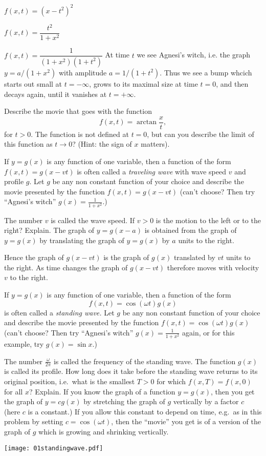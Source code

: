 \begin{multicols}{2}
\subprob $f(x, t) = (x-t^2)^2$

\subprob $f(x, t) = \dfrac{t^2}{1+x^2}$

\subprob $f(x, t) = \dfrac{1}{(1+x^2) (1+t^2)}$
\answer
At time $t$ we see Agnesi's witch, i.e. the graph $y= a/(1+x^2)$
with amplitude $a=1/(1+t^2)$.  Thus we see a bump whcich starts out small
 at $t=-\infty$, grows to its maximal size at time $t=0$, and then decays
again, until it vanishes at $t=+\infty$.
\endanswer

\problem Describe the movie that goes with the function
\[
  f(x, t) = \arctan \frac xt,
\]
for $t>0$.  The function is not defined at $t=0$, but can you describe the limit
of this function as $t\to0$?  (Hint: the sign of $x$ matters).


\problem \label{prb:01traveling-waves}
If $y=g(x)$ is any function of one variable, then a function of the
form $f(x, t) = g(x-vt)$ is often called a \emph{traveling wave} with
wave speed $v$ and profile $g$.  Let $g$ be any non constant
function of your choice and describe the movie presented by the
function $f(x, t) = g(x-vt)$ (can't choose?  Then try ``Agnesi's
witch'' $g(x) = \frac{1}{1+x^2}$.)

The number $v$ is called the wave speed.  If $v>0$ is the motion to
the left or to the right? Explain.
\answer
The graph of $y=g(x-a)$ is obtained from the graph of $y=g(x)$ by
translating the graph of $y=g(x)$ by $a$ units to the right.

Hence the graph of $g(x-vt)$ is the graph of $g(x)$ translated by $vt$
units to the right.  As time changes the graph of $g(x-vt)$ therefore
moves with velocity $v$ to the right.
\endanswer


\problem If $y=g(x)$ is any function of one variable, then a function 
of the form
\[
  f(x, t) = \cos(\omega t) g(x)
\]
is often called a \emph{standing wave.}
Let $g$ be any non constant function of your choice and describe the
movie presented by the function $f(x, t) = \cos(\omega t)g(x)$
(can't choose?  Then try ``Agnesi's witch''  $g(x) = \frac{1}{1+x^2}$
again, or for this example, try $g(x) = \sin x$.)

The number $\frac\omega{2\pi}$ is called the frequency of the standing
wave.  The function $g(x)$ is called its profile.  How long does it
take before the standing wave returns to its original position, i.e.\
what is the smallest $T>0$ for which $f(x, T) = f(x, 0)$ for all $x$?
Explain.
\answer
If you know the graph of a function $y=g(x)$, then you get
the graph of $y=cg(x)$ by stretching the graph of $g$ vertically by
a factor $c$ (here $c$ is a constant.)
If you allow this constant to depend on time, e.g.\ as in this
problem by setting $c=\cos(\omega t)$, then the ``movie'' you get is of a
version of the graph of $g$ which is growing and shrinking vertically.

\begin{center}
    \texttt{[image: 01standingwave.pdf]}
\end{center}
\endanswer
\end{multicols}
\noproblemfont


